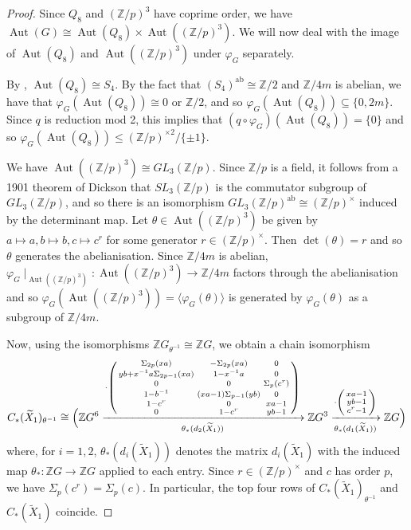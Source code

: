 \documentclass[11pt,a4paper,leqno]{amsart}
\theoremstyle{definition}
\theoremstyle{remark}
\newcommand{\wt}{\widetilde}
\newcommand{\Z}{\mathbb{Z}}
\DeclareMathOperator{\Aut}{Aut}
\begin{document}
\begin{proof}
Since $Q_8$ and $(\Z/p)^3$ have coprime order, we have $\Aut(G) \cong \Aut(Q_8) \times \Aut((\Z/p)^3)$. We will now deal with the image of $\Aut(Q_8)$ and $\Aut((\Z/p)^3)$ under $\varphi_G$ separately.

By \cite[Lemma IV.6.9]{AM04}, $\Aut(Q_8) \cong S_4$. By the fact that $(S_4)^{\text{ab}} \cong \Z/2$ and $\Z/4m$ is abelian, we have that $\varphi_G(\Aut(Q_8)) \cong 0$ or $\Z/2$, and so $\varphi_G(\Aut(Q_8)) \subseteq \{0,2m\}$. Since $q$ is reduction mod 2, this implies that $(q \circ \varphi_G)(\Aut(Q_8)) = \{0\}$ and so $\varphi_G(\Aut(Q_8)) \le (\Z/p)^{\times 2}/\{\pm 1\}$.

We have $\Aut((\Z/p)^3) \cong GL_3(\Z/p)$. Since $\Z/p$ is a field, it follows from a 1901 theorem of Dickson \cite{Di01} that $SL_3(\Z/p)$ is the commutator subgroup of $GL_3(\Z/p)$, and so there is an isomorphism $GL_3(\Z/p)^{\text{ab}} \cong (\Z/p)^\times$ induced by the determinant map. 
Let $\theta \in \Aut((\Z/p)^3)$ be given by $a \mapsto a, b \mapsto b, c \mapsto c^r$ for some generator $r \in (\Z/p)^\times$. Then $\det(\theta) = r$ and so $\theta$ generates the abelianisation. Since $\Z/4m$ is abelian, $\varphi_G \mid_{\Aut((\Z/p)^3)}\colon\Aut((\Z/p)^3) \to \Z/4m$ factors through the abelianisation and so $\varphi_G(\Aut((\Z/p)^3)) = \langle \varphi_G(\theta) \rangle$ is generated by $\varphi_G(\theta)$ as a subgroup of $\Z/4m$.

Now, using the isomorphisms $\Z G_{\theta^{-1}} \cong \Z G$, we obtain a chain isomorphism
\[ C_*(\wt X_1)_{\theta^{-1}} \cong \Bigl (\Z G^6 
\xrightarrow[\theta_*(d_2(\wt X_1))]{
\cdot \left(\begin{smallmatrix} 
\Sigma_{2p}(xa) & -\Sigma_{2p}(xa) & 0 \\
yb+x^{-1}a\Sigma_{2p-1}(xa) & 1-x^{-1}a & 0 \\
0 & 0 & \Sigma_p(c^r) \\
1-b^{-1} & (xa-1)\Sigma_{p-1}(yb) & 0 \\
1-c^r & 0 & xa-1 \\
0 & 1-c^r & yb-1
\end{smallmatrix}\right)
} 
\Z G^3 \xrightarrow[\theta_*(d_1(\wt X_1))]{\cdot \left(\begin{smallmatrix} xa-1 \\ yb-1 \\ c^r-1 \end{smallmatrix}\right)} \Z G \Bigr ) \]
where, for $i =1,2$, $\theta_*(d_i(\wt X_1))$ denotes the matrix $d_i(\wt X_1)$ with the induced map $\theta_*\colon\Z G \to \Z G$ applied to each entry.
Since $r \in (\Z/p)^\times$ and $c$ has order $p$, we have $\Sigma_p(c^r) = \Sigma_p(c)$. In particular, the top four rows of $C_*(\wt X_1)_{\theta^{-1}}$ and $C_*(\wt X_1)$ coincide.


\end{proof}
\end{document}
